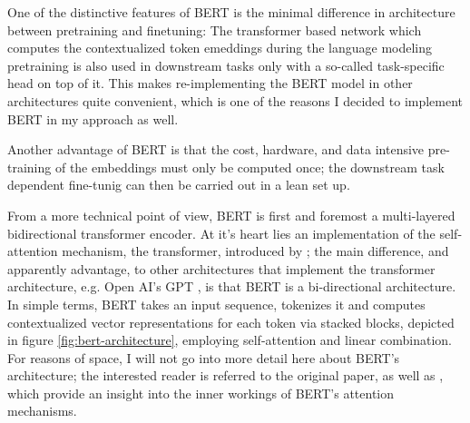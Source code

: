 One of the distinctive features of BERT is the minimal difference in architecture between
pretraining and finetuning: The transformer based network which computes the contextualized
token emeddings during the language modeling pretraining is also used in downstream tasks only
with a so-called task-specific head on top of it. This makes re-implementing the BERT model in
other architectures quite convenient, which is one of the reasons I decided to implement BERT
in my approach as well.

Another advantage of BERT is that the cost, hardware, and data intensive pre-training of the
embeddings must only be computed once; the downstream task dependent fine-tunig can then
be carried out in a lean set up.


From a more technical point of view, BERT is first and foremost a multi-layered bidirectional
transformer encoder. At it's heart lies an implementation of the self-attention mechanism, the
transformer, introduced by \cite{vaswani2017attention}; the main difference, and apparently
advantage, to other architectures that implement the transformer architecture, e.g. Open AI's GPT
\citep{radford2018improving}, is that BERT is a bi-directional architecture. In simple terms, BERT
takes an input sequence, tokenizes it and computes contextualized vector representations for each
token via stacked blocks, depicted in figure \ref{fig:bert-architecture}, employing self-attention
and linear combination. For reasons of space, I will not go into more detail here about BERT's
architecture; the interested reader is referred to the original paper, as well as \cite{clark2019does},
which provide an insight into the inner workings of BERT's attention mechanisms.

